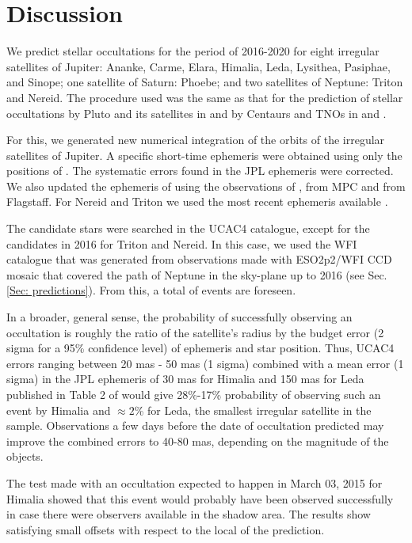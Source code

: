 \documentclass[useAMS,usenatbib]{mn2e}
\begin{document}
\section{Discussion} \label{Sec: discussion}

We predict stellar occultations for the period of 2016-2020 for eight irregular satellites of Jupiter: Ananke, Carme, Elara, Himalia, Leda, Lysithea, Pasiphae, and Sinope; one satellite of Saturn: Phoebe; and two satellites of Neptune: Triton and Nereid. The procedure used was the same as that for the prediction of stellar occultations by Pluto and its satellites in \cite{Assafin2010} and by Centaurs and TNOs in \cite{Assafin2012} and \cite{Camargo2014}.

For this, we generated new numerical integration of the orbits of the irregular satellites of Jupiter. A specific short-time ephemeris were obtained using only the positions of \cite{GomesJunior2015}. The systematic errors found in the JPL ephemeris \citep{Jacobson2012} were corrected. We also updated the ephemeris of \cite{Desmars2013} using the observations of \cite{GomesJunior2015}, from MPC and from Flagstaff. For Nereid and Triton we used the most recent ephemeris available \citep[, respectively]{Emelyanov2011, Emelyanov2015}.

The candidate stars were searched in the UCAC4 catalogue, except for the candidates in 2016 for Triton and Nereid. In this case, we used the WFI catalogue that was generated from observations made with ESO2p2/WFI CCD mosaic that covered the path of Neptune in the sky-plane up to 2016 (see Sec. \ref{Sec: predictions}). From this, a total of \noccs events are foreseen. 

In a broader, general sense, the probability of successfully observing an occultation is roughly the ratio of the satellite's radius by the budget error (2 sigma for a 95\% confidence level) of ephemeris and star position. Thus, UCAC4 errors ranging between 20 mas - 50 mas (1 sigma) combined with a mean error (1 sigma) in the JPL ephemeris of 30 mas for Himalia and 150 mas for Leda published in Table 2 of \cite{Jacobson2012} would give 28\%-17\% probability of observing such an event by Himalia and $\approx2$\% for Leda, the smallest irregular satellite in the sample. Observations a few days before the date of occultation predicted may improve the combined errors to 40-80 mas, depending on the magnitude of the objects.

The test made with an occultation expected to happen in March 03, 2015 for Himalia showed that this event would probably have been observed successfully in case there were observers available in the shadow area. The results show satisfying small offsets with respect to the local of the prediction.
\end{document}
